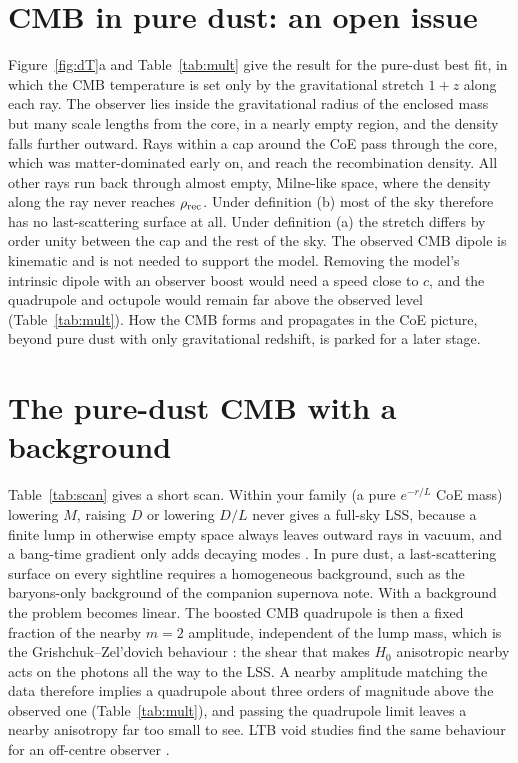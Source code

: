 \documentclass[10pt,twocolumn,letterpaper]{article}
\begin{document}
\section{CMB in pure dust: an open issue}
Figure~\ref{fig:dT}a and Table~\ref{tab:mult} give the result for the pure-dust best fit, in which the CMB temperature is set only by the gravitational stretch $1+z$ along each ray. The observer lies inside the gravitational radius of the enclosed mass but many scale lengths from the core, in a nearly empty region, and the density falls further outward. Rays within a cap around the CoE pass through the core, which was matter-dominated early on, and reach the recombination density. All other rays run back through almost empty, Milne-like space, where the density along the ray never reaches $\rho_{\rm rec}$. Under definition (b) most of the sky therefore has no last-scattering surface at all. Under definition (a) the stretch differs by order unity between the cap and the rest of the sky. The observed CMB dipole is kinematic \cite{Planck2013XXVII} and is not needed to support the model. Removing the model's intrinsic dipole with an observer boost would need a speed close to $c$, and the quadrupole and octupole would remain far above the observed level (Table~\ref{tab:mult}). How the CMB forms and propagates in the CoE picture, beyond pure dust with only gravitational redshift, is parked for a later stage.




\section{The pure-dust CMB with a background}
Table~\ref{tab:scan} gives a short scan. Within your family (a pure $e^{-r/L}$ CoE mass) lowering $M$, raising $D$ or lowering $D/L$ never gives a full-sky LSS, because a finite lump in otherwise empty space always leaves outward rays in vacuum, and a bang-time gradient only adds decaying modes \cite{Clarkson2011}. In pure dust, a last-scattering surface on every sightline requires a homogeneous background, such as the baryons-only background of the companion supernova note. With a background the problem becomes linear. The boosted CMB quadrupole is then a fixed fraction of the nearby $m=2$ amplitude, independent of the lump mass, which is the Grishchuk--Zel'dovich behaviour \cite{GZ1978,Turner1991,Erickcek2008}: the shear that makes $H_0$ anisotropic nearby acts on the photons all the way to the LSS. A nearby amplitude matching the data therefore implies a quadrupole about three orders of magnitude above the observed one (Table~\ref{tab:mult}), and passing the quadrupole limit leaves a nearby anisotropy far too small to see. LTB void studies find the same behaviour for an off-centre observer \cite{Alnes2006,Foreman2010,Enqvist2008,Clarkson2012}.
\end{document}

